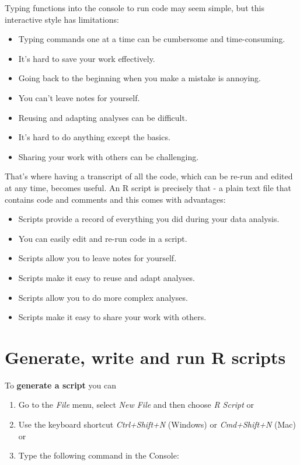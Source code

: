 \documentclass[
  12pt,
  oneside]{book}
\providecommand{\tightlist}{%
  \setlength{\itemsep}{0pt}\setlength{\parskip}{0pt}}
\theoremstyle{definition}
\theoremstyle{definition}
\theoremstyle{definition}
\theoremstyle{definition}
\theoremstyle{remark}
\begin{document}
Typing functions into the console to run code may seem simple, but this interactive style has limitations:

\begin{itemize}
\tightlist
\item
  Typing commands one at a time can be cumbersome and time-consuming.
\item
  It's hard to save your work effectively.
\item
  Going back to the beginning when you make a mistake is annoying.
\item
  You can't leave notes for yourself.
\item
  Reusing and adapting analyses can be difficult.
\item
  It's hard to do anything except the basics.
\item
  Sharing your work with others can be challenging.
\end{itemize}

That's where having a transcript of all the code, which can be re-run and edited at any time, becomes useful. An R script is precisely that - a plain text file that contains code and comments and this comes with advantages:

\begin{itemize}
\tightlist
\item
  Scripts provide a record of everything you did during your data analysis.
\item
  You can easily edit and re-run code in a script.
\item
  Scripts allow you to leave notes for yourself.
\item
  Scripts make it easy to reuse and adapt analyses.
\item
  Scripts allow you to do more complex analyses.
\item
  Scripts make it easy to share your work with others.
\end{itemize}

\hypertarget{generate-write-and-run-r-scripts}{%
\section{Generate, write and run R scripts}\label{generate-write-and-run-r-scripts}}

To \textbf{generate a script} you can

\begin{enumerate}
\def\labelenumi{\arabic{enumi}.}
\tightlist
\item
  Go to the \emph{File} menu, select \emph{New File} and then choose \emph{R Script} or
\item
  Use the keyboard shortcut \emph{Ctrl+Shift+N} (Windows) or \emph{Cmd+Shift+N} (Mac) or
\item
  Type the following command in the Console:
\end{enumerate}
\end{document}
